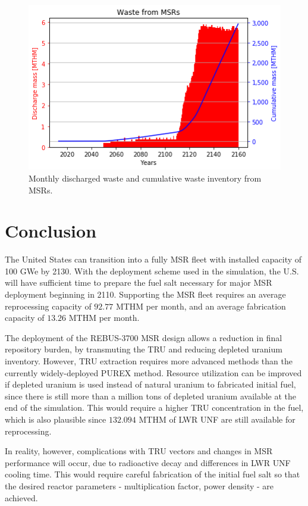 \begin{figure}[htbp!]
	\begin{center}
		\includegraphics[scale=0.6]{./images/us/msr_waste.png}
	\end{center}
	\caption{Monthly discharged waste and cumulative waste inventory from
			\glspl{MSR}.}
	\label{fig:msr_waste}
\end{figure}


\section{Conclusion}
The United States can transition into a fully \gls{MSR} fleet with
installed capacity of 100 GWe by 2130. With the deployment
scheme used in the simulation, the U.S. will have sufficient
time to prepare the fuel salt necessary for major \gls{MSR} deployment
beginning in 2110. Supporting the \gls{MSR} fleet requires an average
reprocessing capacity of $92.77$ MTHM per month, and an average
fabrication capacity of $13.26$ MTHM per month. 

The deployment of the REBUS-3700 \gls{MSR} design allows a reduction
in final repository burden, by transmuting the \gls{TRU} and reducing depleted uranium inventory.
However, \gls{TRU} extraction requires more advanced methods than the currently
widely-deployed PUREX method. Resource utilization can be improved if depleted
uranium is used instead of natural uranium to fabricated initial fuel, since
there is still more than a million tons of depleted uranium available at the
end of the simulation. This would require a higher \gls{TRU} concentration
in the fuel, which is also plausible since $132.094$ MTHM of \gls{LWR} \gls{UNF}
are still available for reprocessing.

In reality, however, complications with \gls{TRU} vectors and changes in \gls{MSR}
performance will occur, due to radioactive decay and differences in \gls{LWR} \gls{UNF}
cooling time. This would require careful fabrication of the initial fuel salt
so that the desired reactor parameters - multiplication factor, power density - are achieved.

